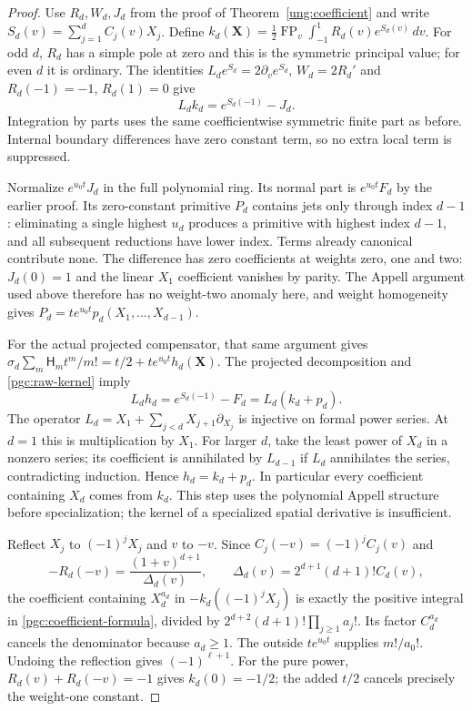 \begin{proof}
Use $R_d,W_d,J_d$ from the proof of Theorem~\ref{ung:coefficient} and
write $S_d(v)=\sum_{j=1}^dC_j(v)X_j$.
Define $k_d(\mathbf X)=\tfrac12\operatorname{FP}_v
\int_{-1}^1R_d(v)e^{S_d(v)}\,dv$.
For odd $d$, $R_d$ has a simple pole at zero and this is the symmetric
principal value; for even $d$ it is ordinary.
The identities $L_de^{S_d}=2\partial_ve^{S_d}$, $W_d=2R_d'$ and
$R_d(-1)=-1$, $R_d(1)=0$ give
\begin{equation}\label{pgc:raw-kernel}
                 L_dk_d=e^{S_d(-1)}-J_d.
\end{equation}
Integration by parts uses the same coefficientwise symmetric finite
part as before. Internal boundary differences have zero constant term,
so no extra local term is suppressed.

Normalize $e^{u_0t}J_d$ in the full polynomial ring. Its normal part is
$e^{u_0t}F_d$ by the earlier proof. Its zero-constant primitive $P_d$
contains jets only through index $d-1$: eliminating a single highest
$u_d$ produces a primitive with highest index $d-1$, and all subsequent
reductions have lower index. Terms already canonical contribute none.
The difference has zero coefficients at weights zero, one and two:
$J_d(0)=1$ and the linear $X_1$ coefficient vanishes by parity.
The Appell argument used above therefore has no weight-two anomaly here,
and weight homogeneity gives
$P_d=t e^{u_0t}p_d(X_1,\ldots,X_{d-1})$.

For the actual projected compensator, that same argument gives
$\sigma_d\sum_m\mathsf H_mt^m/m!=t/2+t e^{u_0t}h_d(\mathbf X)$.
The projected decomposition and \eqref{pgc:raw-kernel} imply
\[
 L_dh_d=e^{S_d(-1)}-F_d=L_d(k_d+p_d).
\]
The operator $L_d=X_1+\sum_{j<d}X_{j+1}\partial_{X_j}$ is injective
on formal power series. At $d=1$ this is multiplication by $X_1$.
For larger $d$, take the least power of $X_d$ in a nonzero series;
its coefficient is annihilated by $L_{d-1}$ if $L_d$ annihilates the
series, contradicting induction. Hence $h_d=k_d+p_d$.
In particular every coefficient containing $X_d$ comes from $k_d$.
This step uses the polynomial Appell structure before specialization;
the kernel of a specialized spatial derivative is insufficient.

Reflect $X_j$ to $(-1)^jX_j$ and $v$ to $-v$.
Since $C_j(-v)=(-1)^jC_j(v)$ and
\[
 -R_d(-v)=\frac{(1+v)^{d+1}}{\Delta_d(v)},\qquad
 \Delta_d(v)=2^{d+1}(d+1)!C_d(v),
\]
the coefficient containing $X_d^{a_d}$ in $-k_d((-1)^jX_j)$
is exactly the positive integral in \eqref{pgc:coefficient-formula},
divided by $2^{d+2}(d+1)!\prod_{j\ge1}a_j!$.
Its factor $C_d^{a_d}$ cancels the denominator because $a_d\ge1$.
The outside $t e^{u_0t}$ supplies $m!/a_0!$.
Undoing the reflection gives $(-1)^{\ell+1}$.
For the pure power, $R_d(v)+R_d(-v)=-1$ gives $k_d(0)=-1/2$;
the added $t/2$ cancels precisely the weight-one constant.


\end{proof}
